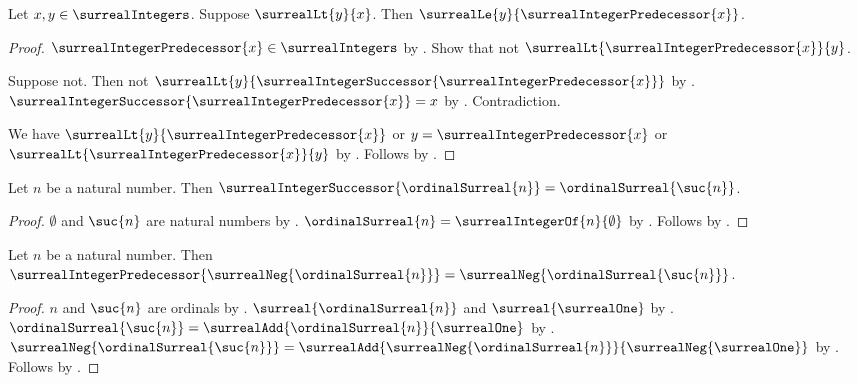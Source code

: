 \begin{theorem}\label{surreal_integer_predecessor_is_greatest_smaller}
    Let $x,y\in\surrealIntegers$.
    Suppose $\surrealLt{y}{x}$.
    Then $\surrealLe{y}{\surrealIntegerPredecessor{x}}$.
\end{theorem}
\begin{proof}
    $\surrealIntegerPredecessor{x}\in\surrealIntegers$
        by .
    Show that not
        $\surrealLt{\surrealIntegerPredecessor{x}}{y}$.
    \begin{subproof}
        Suppose not.
        Then not
            $\surrealLt
                {y}
                {\surrealIntegerSuccessor{\surrealIntegerPredecessor{x}}}$
            by .
        $\surrealIntegerSuccessor{\surrealIntegerPredecessor{x}}=x$
            by .
        Contradiction.
    \end{subproof}
    We have
        $\surrealLt{y}{\surrealIntegerPredecessor{x}}$ or
        $y=\surrealIntegerPredecessor{x}$ or
        $\surrealLt{\surrealIntegerPredecessor{x}}{y}$
        by .
    Follows by .
\end{proof}

\begin{proposition}\label{surreal_integer_natural_successor}
    Let $n$ be a natural number.
    Then
        $\surrealIntegerSuccessor{\ordinalSurreal{n}}
        =\ordinalSurreal{\suc{n}}$.
\end{proposition}
\begin{proof}
    $\emptyset$ and $\suc{n}$ are natural numbers
        by .
    $\ordinalSurreal{n}=\surrealIntegerOf{n}{\emptyset}$
        by .
    Follows by
        .
\end{proof}

\begin{proposition}\label{surreal_integer_negative_predecessor}
    Let $n$ be a natural number.
    Then
        $\surrealIntegerPredecessor{
            \surrealNeg{\ordinalSurreal{n}}}
        =\surrealNeg{\ordinalSurreal{\suc{n}}}$.
\end{proposition}
\begin{proof}
    $n$ and $\suc{n}$ are ordinals
        by .
    $\surreal{\ordinalSurreal{n}}$ and
        $\surreal{\surrealOne}$
        by .
    $\ordinalSurreal{\suc{n}}
        =\surrealAdd{\ordinalSurreal{n}}{\surrealOne}$
        by .
    $\surrealNeg{\ordinalSurreal{\suc{n}}}
        =\surrealAdd
            {\surrealNeg{\ordinalSurreal{n}}}
            {\surrealNeg{\surrealOne}}$
        by .
    Follows by .
\end{proof}

